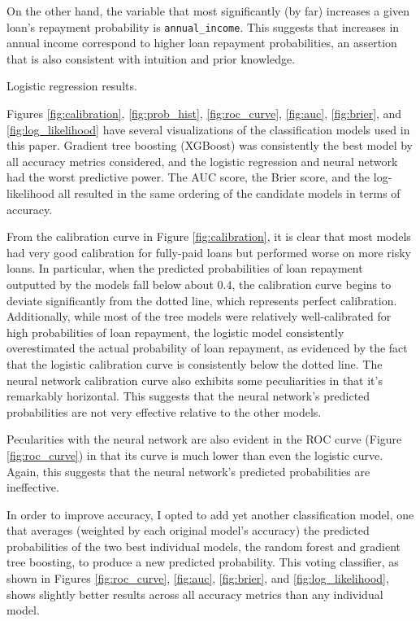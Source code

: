 \documentclass[12pt]{article}
\begin{document}
On the other hand, the variable that most significantly (by far) increases a given loan's repayment probability is \texttt{annual\_income}. This suggests that increases in annual income correspond to higher loan repayment probabilities, an assertion that is also consistent with intuition and prior knowledge. 

\begin{table}[!htbp]
    \footnotesize
    
    \caption{Logistic regression results.}
    \label{table:logistic_results}
\end{table}

Figures \ref{fig:calibration}, \ref{fig:prob_hist}, \ref{fig:roc_curve}, \ref{fig:auc}, \ref{fig:brier}, and \ref{fig:log_likelihood} have several visualizations of the classification models used in this paper. Gradient tree boosting (XGBoost) was consistently the best model by all accuracy metrics considered, and the logistic regression and neural network had the worst predictive power. The AUC score, the Brier score, and the log-likelihood all resulted in the same ordering of the candidate models in terms of accuracy.

From the calibration curve in Figure \ref{fig:calibration}, it is clear that most models had very good calibration for fully-paid loans but performed worse on more risky loans. In particular, when the predicted probabilities of loan repayment outputted by the models fall below about $0.4$, the calibration curve begins to deviate significantly from the dotted line, which represents perfect calibration. Additionally, while most of the tree models were relatively well-calibrated for high probabilities of loan repayment, the logistic model consistently overestimated the actual probability of loan repayment, as evidenced by the fact that the logistic calibration curve is consistently below the dotted line. The neural network calibration curve also exhibits some peculiarities in that it's remarkably horizontal. This suggests that the neural network's predicted probabilities are not very effective relative to the other models. 

Pecularities with the neural network are also evident in the ROC curve (Figure \ref{fig:roc_curve}) in that its curve is much lower than even the logistic curve. Again, this suggests that the neural network's predicted probabilities are ineffective. 

In order to improve accuracy, I opted to add yet another classification model, one that averages (weighted by each original model's accuracy) the predicted probabilities of the two best individual models, the random forest and gradient tree boosting, to produce a new predicted probability. This voting classifier, as shown in Figures \ref{fig:roc_curve}, \ref{fig:auc}, \ref{fig:brier}, and \ref{fig:log_likelihood}, shows slightly better results across all accuracy metrics than any individual model. 
\end{document}
